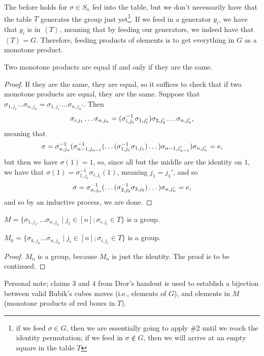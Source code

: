 \noindent The before holds for $\sigma \in S_n$ fed into the table, but we don't necessarily have that the table $T$ generates the group just yet\footnote{if we feed $\sigma \in G$, then we are essentially going to apply \#2 until we reach the identity permutation; if we feed in $\sigma \not\in G$, then we will arrive at an empty square in the table $T$}. If we feed in a generator $g_i$, we have that $g_i$ is in $\left<T\right>$, meaning that by feeding our generators, we indeed have that $\left<T\right> = G$. Therefore, feeding products of elements is to get everything in $G$ as a monotone product.
\begin{lemma}
    Two monotone products are equal if and only if they are the same.
\end{lemma}
\begin{proof}
    If they are the same, they are equal, so it suffices to check that if two monotone products are equal, they are the same. Suppose that $\sigma_{1,j_1} \dots \sigma_{n,j_n} = \sigma_{1,j_1'} \dots \sigma_{n,j_n'}$. Then
    \[ \sigma_{i,j_1} \dots \sigma_{n,j_n} = (\sigma_{i,j_1}^{-1} \sigma_{1,j_1'}) \sigma_{2,j_2'} \dots \sigma_{n,j_n'}, \]
    meaning that
    \[ \sigma = \sigma_{n,j_n}^{-1} (\sigma_{n-1,j_{n-1}}^{-1} (\dots(\sigma_{1,j_1}^{-1} \sigma_{1,j_1})\dots)\sigma_{n-1,j_{n-1}'})\sigma_{n,j_n'} = e, \]
    but then we have $\sigma(1) = 1$, so, since all but the middle are the identity on $1$, we have that $\sigma(1) = \sigma_{1,j_1}^{-1} \sigma_{i,j_i}(1)$, meaning $j_1 = j_1'$, and so
    \[ \sigma = \sigma_{n,j_n}^{-1} ( \dots (\sigma_{2,j_2}^{-1} \sigma_{2,j_2}) \dots) \sigma_{n,j_n'} = e, \]
    and so by an inductive process, we are done.
\end{proof}
\begin{lemma}
    $M = \{\sigma_{1,j_1,} \dots \sigma_{n,j_n} \mid j_i \in [n]; \sigma_{i,j_i} \in T \}$ is a group.
\end{lemma}
\begin{lemma}
    $M_k = \{\sigma_{k,j_k} \dots \sigma_{n,j_n} \mid j_i \in [n]; \sigma_{i,j_i} \in T\}$ is a group.
\end{lemma}
\begin{proof}
    $M_n$ is a group, because $M_n$ is just the identity. The proof is to be continued.
\end{proof}
\noindent Personal note; claims $3$ and $4$ from Dror's handout is used to establish a bijection between valid Rubik's cubes moves (i.e., elements of $G$), and elements in $M$ (monotone products of red boxes in $T$).
\\[8pt]

